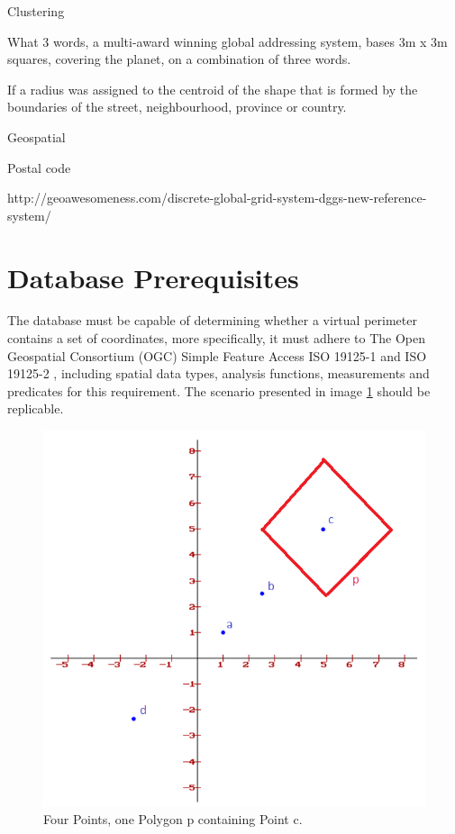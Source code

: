 Clustering

What 3 words, a multi-award winning global addressing system, bases 3m x 3m squares, covering the planet, on a combination of three words.

If a radius was assigned to the centroid of the shape that is formed by the boundaries of the street, neighbourhood, province or country.

Geospatial

Postal code

http://geoawesomeness.com/discrete-global-grid-system-dggs-new-reference-system/


%
\section{Database Prerequisites}
The database must be capable of determining whether a virtual perimeter contains a set of coordinates, more specifically, it must adhere to The Open Geospatial Consortium (OGC) Simple Feature Access ISO 19125-1 \cite{SFA} and ISO 19125-2 \cite{SFS}, including spatial data types, analysis functions, measurements and predicates for this requirement. The scenario presented in image \ref{fig:square} should be replicable.

\begin{figure}[htbp!]
	\centering
	\includegraphics[width=.5\textwidth]{Square}
	\caption[Square]{Four Points, one Polygon p containing Point c.}
	\label{fig:square}
\end{figure}

